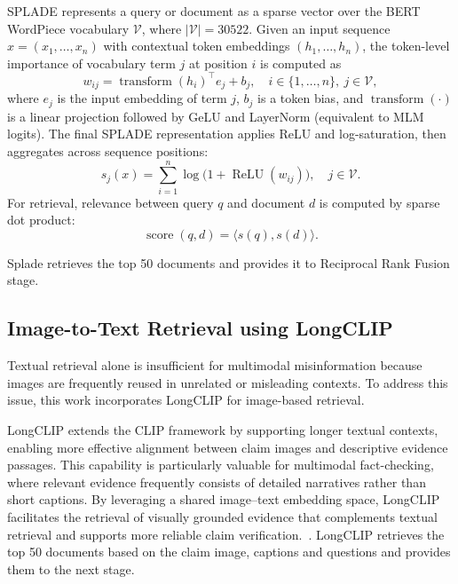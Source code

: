 SPLADE represents a query or document as a sparse vector over the BERT WordPiece vocabulary $\mathcal{V}$, where $|\mathcal{V}|=30522$.  
Given an input sequence $x=(x_1,\ldots,x_n)$ with contextual token embeddings $(h_1,\ldots,h_n)$, the token-level importance of vocabulary term $j$ at position $i$ is computed as
\begin{equation}
w_{ij}=\operatorname{transform}(h_i)^\top e_j + b_j,
\quad i\in\{1,\ldots,n\},\ j\in\mathcal{V},
\end{equation}
where $e_j$ is the input embedding of term $j$, $b_j$ is a token bias, and $\operatorname{transform}(\cdot)$ is a linear projection followed by GeLU and LayerNorm (equivalent to MLM logits).  
The final SPLADE representation applies ReLU and log-saturation, then aggregates across sequence positions:
\begin{equation}
s_j(x)=\sum_{i=1}^{n}\log\!\big(1+\operatorname{ReLU}(w_{ij})\big),\quad j\in\mathcal{V}.
\end{equation}
For retrieval, relevance between query $q$ and document $d$ is computed by sparse dot product:
\begin{equation}
\operatorname{score}(q,d)=\langle s(q),s(d)\rangle.
\end{equation}

Splade retrieves the top 50 documents and provides it to Reciprocal Rank Fusion stage.

\subsection{Image-to-Text Retrieval using LongCLIP}

Textual retrieval alone is insufficient for multimodal misinformation because images are frequently reused in unrelated or misleading contexts. To address this issue, this work incorporates LongCLIP for image-based retrieval.

LongCLIP extends the CLIP framework by supporting longer textual contexts, enabling more effective alignment between claim images and descriptive evidence passages. This capability is particularly valuable for multimodal fact-checking, where relevant evidence frequently consists of detailed narratives rather than short captions. By leveraging a shared image–text embedding space, LongCLIP facilitates the retrieval of visually grounded evidence that complements textual retrieval and supports more reliable claim verification.~\cite{Zhang2024Mar}. LongCLIP retrieves the top 50 documents based on the claim image, captions and questions and provides them to the next stage.


